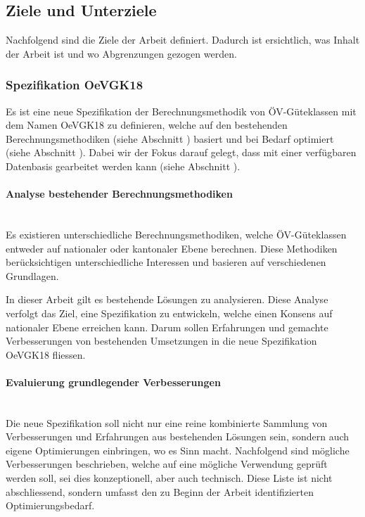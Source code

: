 \subsection{Ziele und Unterziele}
\label{Einführung:Ziele und Unterziele}

Nachfolgend sind die Ziele der Arbeit definiert.
Dadurch ist ersichtlich, was Inhalt der Arbeit ist und wo Abgrenzungen gezogen werden.

\subsubsection{Spezifikation OeVGK18}
\label{Ziele und Unterziele:Spezifikation OeVGK18}

Es ist eine neue Spezifikation der Berechnungsmethodik von \acs{ÖV}-Güteklassen mit dem Namen \gls{OeVGK18} zu definieren, welche auf den bestehenden Berechnungsmethodiken (siehe Abschnitt \emph{}) basiert und bei Bedarf optimiert (siehe Abschnitt \emph{}).
Dabei wir der Fokus darauf gelegt, dass mit einer verfügbaren Datenbasis gearbeitet werden kann (siehe Abschnitt \emph{}).

\paragraph{Analyse bestehender Berechnungsmethodiken}~\\
\label{Spezifikation OeVGK18:Analyse bestehender Berechnungsmethodiken}
Es existieren unterschiedliche Berechnungsmethodiken, welche \acs{ÖV}-Güteklassen entweder auf nationaler oder kantonaler Ebene berechnen.
Diese Methodiken berücksichtigen unterschiedliche Interessen und basieren auf verschiedenen Grundlagen.

In dieser Arbeit gilt es bestehende Lösungen zu analysieren.
Diese Analyse verfolgt das Ziel, eine Spezifikation zu entwickeln, welche einen Konsens auf nationaler Ebene erreichen kann.
Darum sollen Erfahrungen und gemachte Verbesserungen von bestehenden Umsetzungen in die neue Spezifikation \gls{OeVGK18} fliessen.

\paragraph{Evaluierung grundlegender Verbesserungen}~\\
\label{Spezifikation OeVGK18:Evaluierung grundlegender Verbesserungen}
Die neue Spezifikation soll nicht nur eine reine kombinierte Sammlung von Verbesserungen und Erfahrungen aus bestehenden Lösungen sein, sondern auch eigene Optimierungen einbringen, wo es Sinn macht.
Nachfolgend sind mögliche Verbesserungen beschrieben, welche auf eine mögliche Verwendung geprüft werden soll, sei dies konzeptionell, aber auch technisch.
Diese Liste ist nicht abschliessend, sondern umfasst den zu Beginn der Arbeit identifizierten Optimierungsbedarf.

